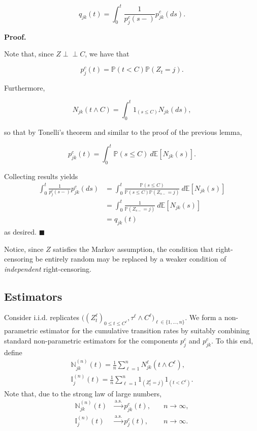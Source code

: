 \documentclass[a4paper,10pt,openany]{book}
\begin{document}
\[
q_{jk}(t)=\int_0^t\frac{1}{p^c_j(s-)}p^c_{jk}(ds).
\]

\textbf{Proof.}

Note that, since \(Z \perp \!\!\! \perp C\), we have that

\[
p_j^c(t)=\mathbb P(t< C)\mathbb P(Z_t=j).
\]

Furthermore,

\[
N_{jk}(t\wedge C)=\int_0^t 1_{(s\le C)}N_{jk}(ds),
\]

so that by Tonelli's theorem and similar to the proof of the previous lemma,

\[
p^c_{jk}(t)=\int_0^t \mathbb P(s\le C)\ d\mathbb E[N_{jk}(s)].
\]

Collecting results yields
\begin{align*}
\int_0^t\frac{1}{p^c_j(s-)}p^c_{jk}(ds)&=\int_0^t\frac{\mathbb P(s\le C)}{\mathbb P(s\le C)\mathbb P(Z_{s-} = j)}\ d\mathbb E[N_{jk}(s)]\\
&=\int_0^t\frac{1}{\mathbb P(Z_{s-} = j)}\ d\mathbb E[N_{jk}(s)]\\
&=q_{jk}(t)
\end{align*}
as desired. \(\blacksquare\)

Notice, since \(Z\) satisfies the Markov assumption, the condition that right-censoring be entirely random may be replaced by a weaker condition of \emph{independent} right-censoring.

\hypertarget{estimators}{%
\subsection{Estimators}\label{estimators}}

Consider i.i.d. replicates \(\Big((Z_t^\ell)_{0\le t\le C^\ell}, \tau^\ell \wedge C^\ell\Big)_{\ell\in \{1,...,n\}}\). We form a non-parametric estimator for the cumulative transition rates by suitably combining standard non-parametric estimators for the components \(p^c_j\) and \(p^c_{jk}\). To this end, define
\begin{align*}
\mathbb N_{jk}^{(n)}(t)=\frac{1}{n}\sum_{\ell = 1}^n N_{jk}^\ell(t\wedge C^\ell),\\
\mathbb I_{j}^{(n)}(t)=\frac{1}{n}\sum_{\ell = 1}^n 1_{(Z_t^\ell = j)}1_{(t<C^\ell)}.
\end{align*}
Note that, due to the strong law of large numbers,
\begin{align*}
\mathbb N_{jk}^{(n)}(t)&\stackrel{\text{a.s.}}{\to}p_{jk}^c(t),&\quad n\to\infty,\\
\mathbb I_{j}^{(n)}(t)&\stackrel{\text{a.s.}}{\to}p_{j}^c(t),&\quad n\to\infty.
\end{align*}
\end{document}
